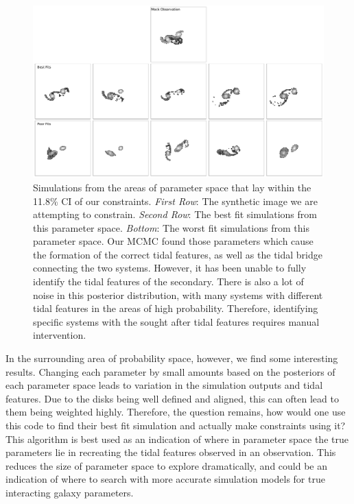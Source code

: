 \begin{figure}
    \centering
    \includegraphics[width=\textwidth]{Chapter1/figures/best-fits-comb.pdf}
    \caption[Simulations from the areas of parameter space that lay within the 11.8\% CI of our constraints.]{Simulations from the areas of parameter space that lay within the 11.8\% CI of our constraints. \textit{First Row}: The synthetic image we are attempting to constrain. \textit{Second Row}: The best fit simulations from this parameter space. \textit{Bottom}: The worst fit simulations from this parameter space. Our MCMC found those parameters which cause the formation of the correct tidal features, as well as the tidal bridge connecting the two systems. However, it has been unable to fully identify the tidal features of the secondary. There is also a lot of noise in this posterior distribution, with many systems with different tidal features in the areas of high probability. Therefore, identifying specific systems with the sought after tidal features requires manual intervention.}
    \label{fig:arp240_corner_plot}
\end{figure}

In the surrounding area of probability space, however, we find some interesting results. Changing each parameter by small amounts based on the posteriors of each parameter space leads to variation in the simulation outputs and tidal features. Due to the disks being well defined and aligned, this can often lead to them being weighted highly. Therefore, the question remains, how would one use this code to find their best fit simulation and actually make constraints using it? This algorithm is best used as an indication of where in parameter space the true parameters lie in recreating the tidal features observed in an observation. This reduces the size of parameter space to explore dramatically, and could be an indication of where to search with more accurate simulation models for true interacting galaxy parameters.

